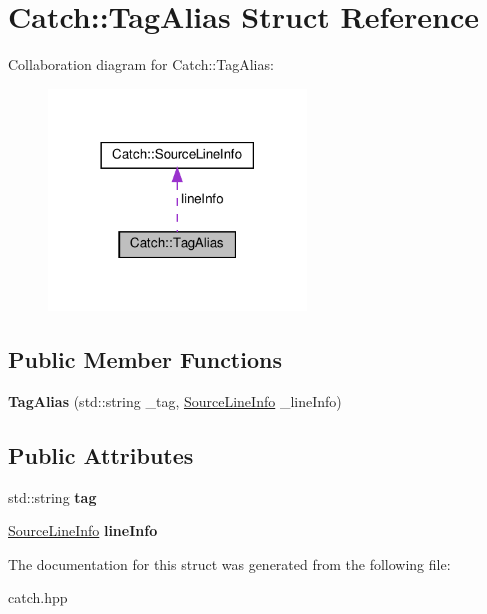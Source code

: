 \hypertarget{structCatch_1_1TagAlias}{}\section{Catch\+:\+:Tag\+Alias Struct Reference}
\label{structCatch_1_1TagAlias}


Collaboration diagram for Catch\+:\+:Tag\+Alias\+:
\nopagebreak
\begin{figure}[H]
\begin{center}
\leavevmode
\includegraphics[width=194pt]{structCatch_1_1TagAlias__coll__graph}
\end{center}
\end{figure}
\subsection*{Public Member Functions}
\begin{DoxyCompactItemize}
\item 
\mbox{\label{structCatch_1_1TagAlias_ad9124d03bfb6f767f1c97572330b05bc}} 
{\bfseries Tag\+Alias} (std\+::string \+\_\+tag, \hyperlink{structCatch_1_1SourceLineInfo}{Source\+Line\+Info} \+\_\+line\+Info)
\end{DoxyCompactItemize}
\subsection*{Public Attributes}
\begin{DoxyCompactItemize}
\item 
\mbox{\label{structCatch_1_1TagAlias_a950183883ab17c90d0fab16b966b6e2d}} 
std\+::string {\bfseries tag}
\item 
\mbox{\label{structCatch_1_1TagAlias_a2f51fe0b3c052561275d26b6eb88f702}} 
\hyperlink{structCatch_1_1SourceLineInfo}{Source\+Line\+Info} {\bfseries line\+Info}
\end{DoxyCompactItemize}


The documentation for this struct was generated from the following file\+:\begin{DoxyCompactItemize}
\item 
catch.\+hpp\end{DoxyCompactItemize}
